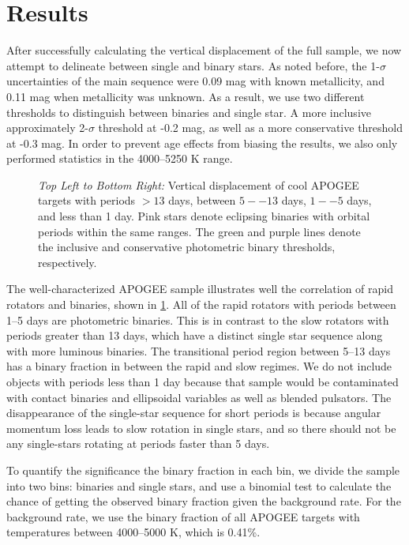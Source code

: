 \documentclass[manuscript]{aastex6}
\begin{document}
\section{Results}
\label{sec:results}


After successfully calculating the vertical displacement of the full sample, we
now attempt to delineate between single and binary stars. As noted before, the
1-\(\sigma\) uncertainties of the main sequence were 0.09 mag with known
metallicity, and 0.11 mag when metallicity was unknown. As a result, we use two
different thresholds to distinguish between binaries and single star. A more
inclusive approximately 2-\(\sigma\) threshold at -0.2 mag, as well as a more
conservative threshold at -0.3 mag. In order to prevent age effects from 
biasing the results, we also only performed statistics in the 4000--5250 K 
range.

\begin{figure}[htb]
    \centering
    \caption{\emph{Top Left to Bottom Right:} Vertical displacement of cool 
        APOGEE targets with \citet{McQuillan14} periods \(> 13\) days, between 
        \(5--13\) days, \(1--5\) days, and less than 1 day. Pink stars denote 
        eclipsing binaries with orbital periods within the same ranges. The 
        green and purple lines denote the inclusive and conservative 
        photometric binary thresholds, 
    respectively.}\label{fig:apogee_rapid_excess}
\end{figure}

The well-characterized APOGEE sample illustrates well the
correlation of rapid rotators and binaries, shown in
\cref{fig:apogee_rapid_excess}. All of the rapid rotators with periods between
1--5 days are photometric binaries. This is in contrast to the slow rotators
with periods greater than 13 days, which have a distinct single star sequence
along with more luminous binaries. The transitional period region between 5--13
days has a binary fraction in between the rapid and slow regimes. We do not
include objects with periods less than 1 day because that sample would be
contaminated with contact binaries and ellipsoidal variables as well as 
blended pulsators. The disappearance of the single-star sequence for short
periods is because angular momentum loss leads to slow rotation in single 
stars, and so there should not be any single-stars rotating at periods faster 
than 5 days.

To quantify the significance the binary fraction in each bin, we divide the
sample into two bins: binaries and single stars, and use a binomial test to
calculate the chance of getting the observed binary fraction given the
background rate. For the background rate, we use the binary fraction of all 
APOGEE targets with temperatures between 4000--5000 K, which is 0.41\%. 
\end{document}
